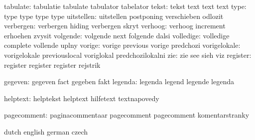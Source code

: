            tabulate:  tabulatie            tabulate            tabulator
                      tabelator
              tekst:  tekst                text                text
                      text
               type:  type                 type                type
                      type
         uitstellen:  uitstellen           postponing          verschieben
                      odlozit
          verbergen:  verbergen            hiding              verbergen
                      skryt
            verhoog:  verhoog              increment           erhoehen
                      zvysit
           volgende:  volgende             next                folgende
                      dalsi
          volledige:  volledige            complete            vollende
                      uplny
             vorige:  vorige               previous            vorige
                      predchozi
       vorigelokale:  vorigelokale         previouslocal       voriglokal
                      predchozilokalni
                zie:  zie                  see                 sieh
                      viz
           register:  register             register            register
                      rejstrik

            gegeven:  gegeven              fact                gegeben
                      fakt
            legenda:  legenda              legend              legende
                      legenda

           helptext:  helptekst            helptext            hilfetext
                      textnapovedy 

        pagecomment:  paginacommentaar     pagecomment         pagecomment 
                      komentarstranky %

\stopelements




\startvariables      dutch             english              german
                     czech

